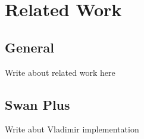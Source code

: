 
\chapter{Related Work} %

\label{Chapter2} %



\section{General}

Write about related work here

\section{Swan Plus}

Write abut Vladimir implementation